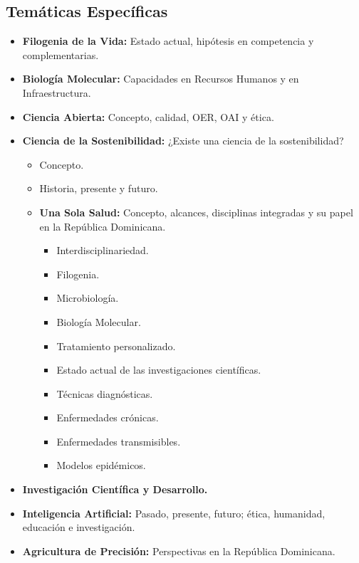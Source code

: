 \documentclass[11pt,a4paper]{article}
\begin{document}
\subsection{Temáticas Específicas}
\begin{itemize}[leftmargin=*, label={--}]
    \item \textbf{Filogenia de la Vida:} Estado actual, hipótesis en competencia y complementarias.
    \item \textbf{Biología Molecular:} Capacidades en Recursos Humanos y en Infraestructura.
    \item \textbf{Ciencia Abierta:} Concepto, calidad, OER, OAI y ética.
    \item \textbf{Ciencia de la Sostenibilidad:} ¿Existe una ciencia de la sostenibilidad?
    \begin{itemize}[leftmargin=1.5em, label={--}]
        \item Concepto.
        \item Historia, presente y futuro.
        \item \textbf{Una Sola Salud:} Concepto, alcances, disciplinas integradas y su papel en la República Dominicana.
        \begin{itemize}[leftmargin=1.5em, label={$\ast$}]
            \item Interdisciplinariedad.
            \item Filogenia.
            \item Microbiología.
            \item Biología Molecular.
            \item Tratamiento personalizado.
            \item Estado actual de las investigaciones científicas.
            \item Técnicas diagnósticas.
            \item Enfermedades crónicas.
            \item Enfermedades transmisibles.
            \item Modelos epidémicos.
        \end{itemize}
    \end{itemize}
    \item \textbf{Investigación Científica y Desarrollo.}
    \item \textbf{Inteligencia Artificial:} Pasado, presente, futuro; ética, humanidad, educación e investigación.
    \item \textbf{Agricultura de Precisión:} Perspectivas en la República Dominicana.

\end{itemize}
\end{document}
